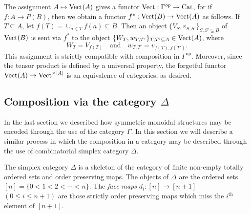 \documentclass[a4paper]{amsart}
\begin{document}
The assignment $A \mapsto \mathrm{Vect}(A)$ gives a functor $\mathrm{Vect}: \Gamma^{op} \to \mathrm{Cat}$, for if $f: A \to P(B)$, then we obtain a functor $f^*: \mathrm{Vect}(B) \to \mathrm{Vect}(A)$ as follows. If $T \subseteq A$, let $f(T) = \cup_{a \in T} f(a) \subseteq B$. Then an object $\{ V_S, v_{S,S'} \}_{S, S' \subseteq B}$ of $\mathrm{Vect}(B)$ is sent via $f^*$ to the object $\{ W_T, w_{T, T'} \}_{T, T' \subseteq A} \in \mathrm{Vect}(A)$, where 
\begin{equation*}
	W_T = V_{f(T)} \quad \textrm{and} \quad  w_{T, T'} = v_{f(T), f(T')}.
\end{equation*}
This assignment is strictly compatible with composition in $\Gamma^\text{op}$. Moreover, since the tensor product is defined by a universal property, the forgetful functor $\mathrm{Vect}(A) \to \mathrm{Vect}^{\times |A|}$ is an equivalence of categories, as desired.  

\subsection{Composition via the category $\Delta$} \label{sec-Compdelta}



In the last section we described how symmetric monoidal structures may be encoded through the use of the category $\Gamma$. In this section we will describe a similar process in which the composition in a category may be described through the use of combinatorial simplex category $\Delta$. 

\begin{definition}
	The simplex category $\Delta$ is a skeleton of the category of finite non-empty totally ordered sets and order preserving maps. The objects of $\Delta$ are the ordered sets $[n] = \{ 0 < 1 < 2 < \cdots < n\}$. The {\em face maps} $d_i: [n] \to [n+1]$  $(0 \leq i \leq n+1)$ are those strictly order preserving maps which miss the $i^\textrm{th}$ element of $[n+1]$. 
\end{definition}
\end{document}
